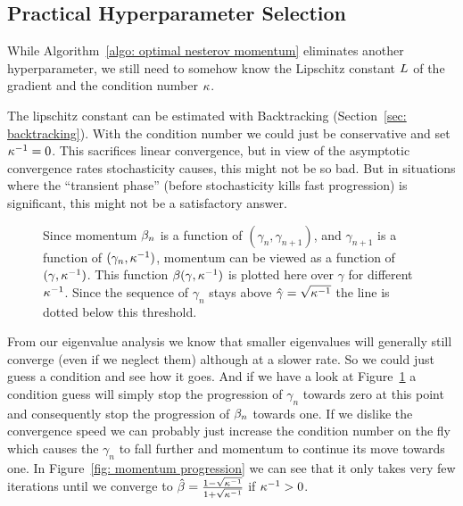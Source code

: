 \subsection{Practical Hyperparameter Selection}

While Algorithm~\ref{algo: optimal nesterov momentum} eliminates another
hyperparameter, we still need to somehow know the Lipschitz constant \(L\)
of the gradient and the condition number \(\kappa\).

The lipschitz constant can be estimated with Backtracking (Section~\ref{sec:
backtracking}). With the condition number we could just be conservative and set
\(\kappa^{-1}=0\). This sacrifices linear convergence, but in view of the
asymptotic convergence rates stochasticity causes, this might not be so bad. But
in situations where the ``transient phase'' (before stochasticity kills fast
progression) is significant, this might not be a satisfactory answer.

\begin{figure}[h]
	\centering
	\def\svgwidth{1\textwidth}
	
	\caption{
		Since momentum \(\beta_n\) is a function of \((\gamma_n,
		\gamma_{n+1})\), and \(\gamma_{n+1}\) is a function of
		\((\gamma_n,\kappa^{-1})\), momentum can be viewed as a function of
		\((\gamma, \kappa^{-1})\). This function
		\(\beta(\gamma,\kappa^{-1})\) is plotted here over \(\gamma\) for
		different \(\kappa^{-1}\). Since the sequence of \(\gamma_n\) stays
		above \(\hat{\gamma}=\sqrt{\kappa^{-1}}\) the line is dotted below
		this threshold.
	}
	\label{fig: momentum gamma plot}
\end{figure}

From our eigenvalue analysis we know that smaller eigenvalues will generally
still converge (even if we neglect them) although at a slower rate. So we
could just guess a condition and see how it goes. And if we have a look at
Figure~\ref{fig: momentum gamma plot} a condition guess will simply stop the
progression of \(\gamma_n\) towards zero at this point and consequently stop the
progression of \(\beta_n\) towards one. If we dislike the convergence speed
we can probably just increase the condition number on the fly which causes the
\(\gamma_n\) to fall further and momentum to continue its move towards one.
In Figure~\ref{fig: momentum progression} we can see that it only takes very
few iterations until we converge to
\(\hat{\beta}=\frac{1-\sqrt{\kappa^{-1}}}{1+\sqrt{\kappa^{-1}}}\)
if \(\kappa^{-1}>0\).

